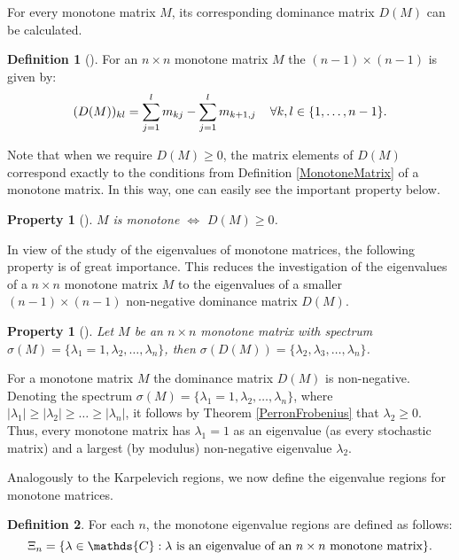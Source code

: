 \documentclass[11pt,a4paper]{article}
\newtheorem{property}[theorem]{Property}
\theoremstyle{definition}
\newtheorem{definition}{Definition}[section]
\theoremstyle{remark}
\begin{document}
For every monotone matrix \(M\), its corresponding dominance matrix \(D(M)\) can be calculated.

\begin{definition}[\cite{conlisk1990monotone}]
For an \(n \times n\) monotone matrix \(M\) the \((n-1) \times (n-1)\)  is given by:
        \[(D(M))_{kl} = \sum_{j=1}^l m_{kj} - \sum_{j=1}^l m_{k+1,j} \hspace{4mm} \forall k,l \in \{1, \ldots, n-1 \} . \]
\end{definition}

Note that when we require \(D(M) \geq 0\), the matrix elements of \(D(M)\) correspond exactly to the conditions from Definition \ref{MonotoneMatrix} of a monotone matrix. In this way, one can easily see the important property below.

\begin{property}[\cite{conlisk1990monotone}]
     \(M\) is monotone \(\Longleftrightarrow\)  \(D(M) \geqslant 0 \).
\end{property}

In view of the study of the eigenvalues of monotone matrices, the following property is of great importance. This reduces the investigation of the eigenvalues of a \(n \times n\) monotone matrix \(M\) to the eigenvalues of a smaller \((n-1) \times (n-1)\) non-negative dominance matrix \(D(M)\).

\begin{property}[\cite{conlisk1990monotone}]\label{spectrumreduction}
Let \(M\) be an \( n \times n \) monotone matrix with spectrum \(\sigma(M) = \{\lambda_1 = 1, \lambda_2, \ldots , \lambda_n \}\), then \(\sigma(D(M)) = \{\lambda_2, \lambda_3, \ldots , \lambda_n \}\).
\end{property}

For a monotone matrix \(M\) the dominance matrix \(D(M)\) is non-negative. Denoting the spectrum \(\sigma(M) = \{\lambda_1 = 1, \lambda_2, \ldots , \lambda_n \}\), where \(|\lambda_1| \geqslant |\lambda_2| \geqslant \ldots \geqslant |\lambda_n| \), it follows by Theorem \ref{PerronFrobenius} that \(\lambda_2 \geqslant 0\). Thus, every monotone matrix has \(\lambda_1=1\) as an eigenvalue (as every stochastic matrix) and a largest (by modulus) non-negative eigenvalue \(\lambda_2\).

Analogously to the Karpelevich regions, we now define the eigenvalue regions for monotone matrices.

\begin{definition} For each \(n\), the monotone eigenvalue regions are defined as follows:
    \[ \Xi_n = \{ \lambda \in \mathds{C} : \lambda \text{ is an eigenvalue of an \(n \times n\) \hfill \\ monotone  matrix}  \}.\]
\end{definition}
\end{document}
